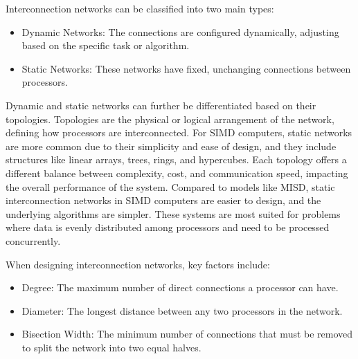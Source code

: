 \documentclass[a4paper, 10pt]{book}
\begin{document}
                    Interconnection networks can be classified into two main types:

                    \begin{itemize}
                        
                        \item {\bold Dynamic Networks:} The connections are configured dynamically, adjusting based on the specific task or algorithm.

                        \item {\bold Static Networks:} These networks have fixed, unchanging connections between processors.

                    \end{itemize}

                    Dynamic and static networks can further be differentiated based on their topologies. Topologies are the physical or logical arrangement of the network, defining how processors are interconnected. For SIMD computers, static networks are more common due to their simplicity and ease of design, and they include structures like linear arrays, trees, rings, and hypercubes. Each topology offers a different balance between complexity, cost, and communication speed, impacting the overall performance of the system. Compared to models like MISD, static interconnection networks in SIMD computers are easier to design, and the underlying algorithms are simpler. These systems are most suited for problems where data is evenly distributed among processors and need to be processed concurrently.

                    When designing interconnection networks, key factors include:

                    \begin{itemize}
                        
                        \item {\bold Degree:} The maximum number of direct connections a processor can have.

                        \item {\bold Diameter:} The longest distance between any two processors in the network.

                        \item {\bold Bisection Width:} The minimum number of connections that must be removed to split the network into two equal halves.

                    \end{itemize}
\end{document}
